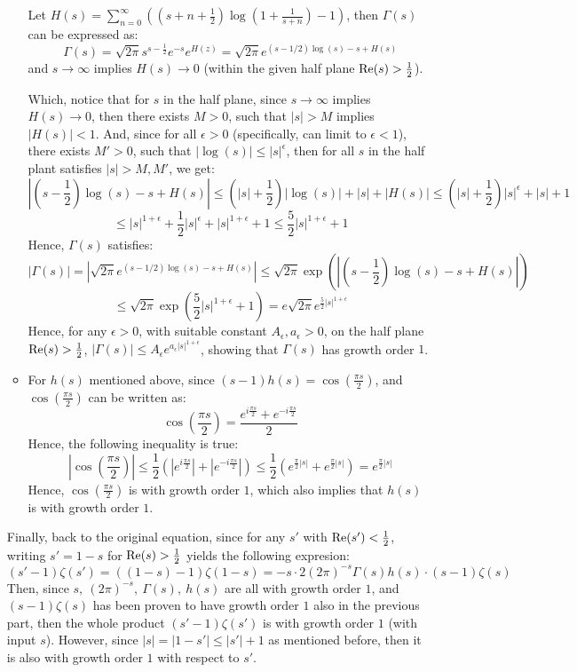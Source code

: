 \documentclass{article}
\begin{document}
\begin{itemize}
\begin{itemize}
        Let $H(s)=\sum_{n=0}^{\infty}\left(\left(s+n+\frac{1}{2}\right)\log\left(1+\frac{1}{s+n}\right)-1\right)$, then $\Gamma(s)$ can be expressed as:
        $$\Gamma(s)=\sqrt{2\pi}s^{s-\frac{1}{2}}e^{-s}e^{H(z)} = \sqrt{2\pi}e^{(s-1/2)\log(s)-s+H(s)}$$
        and $s\rightarrow\infty$ implies $H(s)\rightarrow 0$ (within the given half plane $\textmd{Re}(s)>\frac{1}{2}$).

        Which, notice that for $s$ in the half plane, since $s\rightarrow\infty$ implies $H(s)\rightarrow 0$, then there exists $M>0$, such that $|s|>M$ implies $|H(s)|<1$. And, since for all $\epsilon>0$ (specifically, can limit to $\epsilon<1$), there exists $M'>0$, such that $|\log(s)| \leq |s|^\epsilon$, then for all $s$ in the half plant satisfies $|s|>M,M'$, we get:
        $$\left|\left(s-\frac{1}{2}\right)\log(s)-s+H(s)\right| \leq \left(|s|+\frac{1}{2}\right)|\log(s)| + |s| + |H(s)| \leq \left(|s|+\frac{1}{2}\right)|s|^{\epsilon} + |s| + 1$$
        $$\leq |s|^{1+\epsilon}+\frac{1}{2}|s|^\epsilon+|s|^{1+\epsilon}+1 \leq \frac{5}{2}|s|^{1+\epsilon}+1$$
        Hence, $\Gamma(s)$ satisfies:
        $$|\Gamma(s)| = \left|\sqrt{2\pi}e^{(s-1/2)\log(s)-s+H(s)}\right| \leq \sqrt{2\pi}\exp\left(\left|\left(s-\frac{1}{2}\right)\log(s)-s+H(s)\right|\right)$$
        $$\leq \sqrt{2\pi}\exp\left(\frac{5}{2}|s|^{1+\epsilon}+1\right) = e\sqrt{2\pi}e^{\frac{5}{2}|s|^{1+\epsilon}}$$
        Hence, for any $\epsilon>0$, with suitable constant $A_\epsilon,a_\epsilon>0$, on the half plane $\textmd{Re}(s)>\frac{1}{2}$, $|\Gamma(s)|\leq A_\epsilon e^{a_\epsilon|s|^{1+\epsilon}}$, showing that $\Gamma(s)$ has growth order $1$.

        \item For $h(s)$ mentioned above, since $(s-1)h(s)=\cos\left(\frac{\pi s}{2}\right)$, and $\cos\left(\frac{\pi s}{2}\right)$ can be written as:
        $$\cos\left(\frac{\pi s}{2}\right) = \frac{e^{i\frac{\pi s}{2}}+e^{-i\frac{\pi s}{2}}}{2}$$
        Hence, the following inequality is true:
        $$\left|\cos\left(\frac{\pi s}{2}\right)\right| \leq \frac{1}{2}\left(|e^{i\frac{\pi s}{2}}| + |e^{-i\frac{\pi s}{2}}|\right) \leq \frac{1}{2}\left(e^{\frac{\pi}{2}|s|}+e^{\frac{\pi}{2}|s|}\right) = e^{\frac{\pi}{2}|s|}$$
        Hence, $\cos\left(\frac{\pi s}{2}\right)$ is with growth order $1$, which also implies that $h(s)$ is with growth order $1$.
    \end{itemize}
    Finally, back to the original equation, since for any $s'$ with $\textmd{Re}(s')<\frac{1}{2}$, writing $s' = 1-s$ for $\textmd{Re}(s)>\frac{1}{2}$ yields the following expresion:
    $$(s'-1)\zeta(s')=((1-s)-1)\zeta(1-s) = -s\cdot 2(2\pi)^{-s}\Gamma(s)h(s)\cdot (s-1)\zeta(s)$$
    Then, since $s,\ (2\pi)^{-s},\ \Gamma(s),\ h(s)$ are all with growth order $1$, and $(s-1)\zeta(s)$ has been proven to have growth order $1$ also in the previous part, then the whole product $(s'-1)\zeta(s')$ is with growth order $1$ (with input $s$). However, since $|s| = |1-s'| \leq |s'|+1$ as mentioned before, then it is also with growth order $1$ with respect to $s'$.


\end{itemize}
\end{document}
